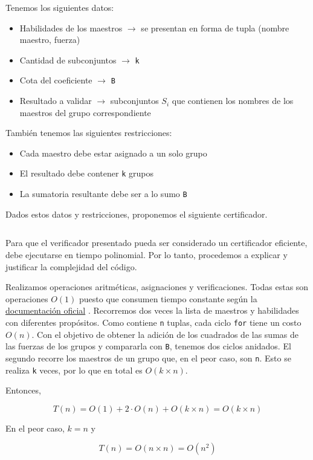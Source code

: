 \documentclass{article}
\newcommand{\docuPy}{%
  {\href{https://wiki.python.org/moin/TimeComplexity}{documentación oficial}}
  }%
\begin{document}
Tenemos los siguientes datos:
\begin{itemize}
    \item Habilidades de los maestros $\rightarrow$ se presentan en forma de tupla (nombre maestro, fuerza)
    \item Cantidad de subconjuntos $\rightarrow$ \texttt{k}
    \item Cota del coeficiente $\rightarrow$ \texttt{B}
    \item Resultado a validar $\rightarrow$ subconjuntos $S_i$ que contienen los nombres de los maestros del grupo correspondiente
\end{itemize}

También tenemos las siguientes restricciones:
\begin{itemize}
    \item Cada maestro debe estar asignado a un solo grupo
    \item El resultado debe contener \texttt{k} grupos
    \item La sumatoria resultante debe ser a lo sumo \texttt{B} 
\end{itemize}

Dados estos datos y restricciones, proponemos el siguiente certificador.
\inputminted[linenos, firstline=1, lastline=31]{python}{codigo/certificador_eficiente.py}

Para que el verificador presentado pueda ser considerado un certificador eficiente, debe ejecutarse en tiempo polinomial. Por lo tanto, procedemos a explicar y justificar la complejidad del código.

Realizamos operaciones aritméticas, asignaciones y verificaciones. Todas estas son operaciones $O(1)$ puesto que consumen tiempo constante según la \docuPy. Recorremos dos veces la lista de maestros y habilidades con diferentes propósitos. Como contiene \texttt{n} tuplas, cada ciclo \texttt{for} tiene un costo $O(n)$. Con el objetivo de obtener la adición de los cuadrados de las sumas de las fuerzas de los grupos y compararla con \texttt{B}, tenemos dos ciclos anidados. El segundo recorre los maestros de un grupo que, en el peor caso, son \texttt{n}. Esto se realiza \texttt{k} veces, por lo que en total es $O(k \times n)$.

Entonces,

$$
T(n) = O(1) + 2 \cdot O(n) + O(k \times n) = O(k \times n)  
$$

En el peor caso, $k = n$ y

$$
T(n) = O(n \times n) = O(n^2)
$$
\end{document}
